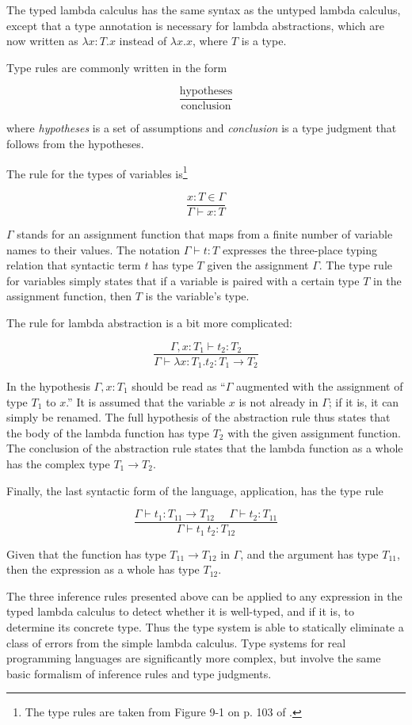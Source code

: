 \documentclass{article}
\begin{document}
The typed lambda calculus has the same syntax as the untyped lambda calculus, except that a type annotation is necessary for lambda abstractions, which are now written as $\lambda x: T . x$ instead of $\lambda x. x$, where $T$ is a type.

Type rules are commonly written in the form

\[
\frac{\text{hypotheses}}
{\text{conclusion}}
\]

where \textit{hypotheses} is a set of assumptions and \textit{conclusion} is a type judgment that follows from the hypotheses.

The rule for the types of variables is\footnote{The type rules are taken from Figure 9-1 on p. 103 of \cite{types}.}

\[
\frac{x : T \in \Gamma}
{\Gamma \vdash x : T}
\]

$\Gamma$ stands for an assignment function that maps from a finite number of variable names to their values. The notation $\Gamma \vdash t : T$ expresses the three-place typing relation that syntactic term $t$ has type $T$ given the assignment $\Gamma$. The type rule for variables simply states that if a variable is paired with a certain type $T$ in the assignment function, then $T$ is the variable's type.

The rule for lambda abstraction is a bit more complicated:

\[
\frac{\Gamma, x : T_1 \vdash t_2 : T_2}
{\Gamma \vdash \lambda x : T_1 . t_2 : T_1 \to T_2}
\]

In the hypothesis $\Gamma, x : T_1$ should be read as ``$\Gamma$ augmented with the assignment of type $T_1$ to $x$.'' It is assumed that the variable $x$ is not already in $\Gamma$; if it is, it can simply be renamed. The full hypothesis of the abstraction rule thus states that the body of the lambda function has type $T_2$ with the given assignment function. The conclusion of the abstraction rule states that the lambda function as a whole has the complex type $T_1 \to T_2$.

Finally, the last syntactic form of the language, application, has the type rule

\[
\frac{\Gamma \vdash t_1 : T_{11} \to T_{12}\ \ \ \ \ \ \Gamma \vdash t_2 : T_{11}}
{\Gamma \vdash t_1\ t_2 : T_{12}}
\]

Given that the function has type $T_{11} \to T_{12}$ in $\Gamma$, and the argument has type $T_{11}$, then the expression as a whole has type $T_{12}$.

The three inference rules presented above can be applied to any expression in the typed lambda calculus to detect whether it is well-typed, and if it is, to determine its concrete type. Thus the type system is able to statically eliminate a class of errors from the simple lambda calculus. Type systems for real programming languages are significantly more complex, but involve the same basic formalism of inference rules and type judgments.
\end{document}
